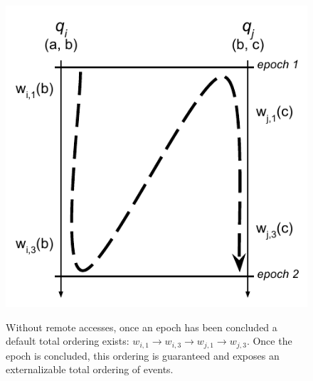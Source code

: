 \begin{figure}
    \begin{center}
        \includegraphics[width=5in]{figures/ch03_event_ordering.pdf}
    \end{center}
    \renewcommand{\baselinestretch}{1}
    \small\normalsize

    \begin{quote}
        \caption[Sequential Event Ordering in HC]{Without remote accesses, once an epoch has been concluded a default total ordering exists: $w_{i,1}\rightarrow w_{i,3}\rightarrow w_{j,1}\rightarrow w_{j,3}$. Once the epoch is concluded, this ordering is guaranteed and exposes an externalizable total ordering of events.}
        \label{fig:ch03_event_ordering}
    \end{quote}
\end{figure}
\renewcommand{\baselinestretch}{2}
\small\normalsize

